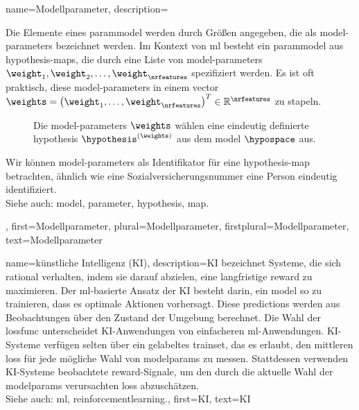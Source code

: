 {{{{
{
name={Modellparameter}, 
description={Die Elemente eines \gls{parammodel} werden durch Größen angegeben, die als \gls{model}-\glspl{parameter} bezeichnet werden. 
Im Kontext von \gls{ml} besteht ein \gls{parammodel} aus \gls{hypothesis}-\glspl{map}, die durch eine Liste von \gls{model}-\glspl{parameter} $\weight_{1}, \weight_{2}, \ldots, \weight_{\nrfeatures}$ spezifiziert werden. Es ist oft praktisch, diese \gls{model}-\glspl{parameter} in einem \gls{vector} 
$\weights=\big(\weight_{1},\ldots,\weight_{\nrfeatures}\big)^{T} \in \mathbb{R}^{\nrfeatures}$ zu stapeln.
\begin{figure}[H]
\centering
{}
\caption{Die \gls{model}-\glspl{parameter} $\weights$ wählen eine eindeutig definierte \gls{hypothesis} $\hypothesis^{(\weights)}$ aus dem \gls{model} $\hypospace$ aus.}
\end{figure}
Wir können \gls{model}-\glspl{parameter} als Identifikator für eine \gls{hypothesis}-\gls{map} betrachten, ähnlich wie eine Sozialversicherungsnummer eine Person eindeutig identifiziert.\\
Siehe auch: \gls{model}, \gls{parameter}, \gls{hypothesis}, \gls{map}.
},
first={Modellparameter},
plural={Modellparameter},
firstplural={Modellparameter},
text={Modellparameter}
}

{name={künstliche Intelligenz (KI)}, 
	description={KI bezeichnet Systeme, die sich rational verhalten, 
	indem sie darauf abzielen, eine langfristige \gls{reward} zu maximieren. 
	Der \gls{ml}-basierte Ansatz der KI besteht darin, ein \gls{model} so zu trainieren, dass es optimale Aktionen 
	vorhersagt. Diese \glspl{prediction} werden aus Beobachtungen über den Zustand der Umgebung berechnet. 
	Die Wahl der \gls{lossfunc} unterscheidet KI-Anwendungen von einfacheren \gls{ml}-Anwendungen. 
	KI-Systeme verfügen selten über ein gelabeltes \gls{trainset}, das es erlaubt, den mittleren \gls{loss} 
	für jede mögliche Wahl von \glspl{modelparam} zu messen. Stattdessen verwenden KI-Systeme beobachtete 
	\gls{reward}-Signale, um den durch die aktuelle Wahl der \glspl{modelparam} verursachten \gls{loss} abzuschätzen.\\
	Siehe auch: \gls{ml}, \gls{reinforcementlearning}.},
	first={KI},
	text={KI} 
}

}}}}
